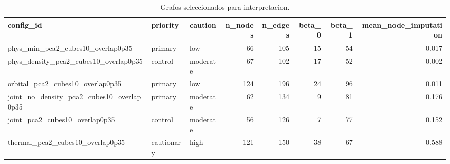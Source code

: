 \begin{table}[H]
\centering
\scriptsize
\caption{Grafos seleccionados para interpretacion.}
\label{tab:main_graph_selection}
\begin{adjustbox}{max width=\linewidth}
\begin{tabular}{lllrrrrr}
\toprule
config\_id & priority & caution & n\_nodes & n\_edges & beta\_0 & beta\_1 & mean\_node\_imputation \\
\midrule
phys\_min\_pca2\_cubes10\_overlap0p35 & primary & low & 66 & 105 & 15 & 54 & 0.017 \\
phys\_density\_pca2\_cubes10\_overlap0p35 & control & moderate & 67 & 102 & 17 & 52 & 0.002 \\
orbital\_pca2\_cubes10\_overlap0p35 & primary & low & 124 & 196 & 24 & 96 & 0.011 \\
joint\_no\_density\_pca2\_cubes10\_overlap0p35 & primary & moderate & 62 & 134 & 9 & 81 & 0.176 \\
joint\_pca2\_cubes10\_overlap0p35 & control & moderate & 56 & 126 & 7 & 77 & 0.152 \\
thermal\_pca2\_cubes10\_overlap0p35 & cautionary & high & 121 & 150 & 38 & 67 & 0.588 \\
\bottomrule
\end{tabular}
\end{adjustbox}

\end{table}
